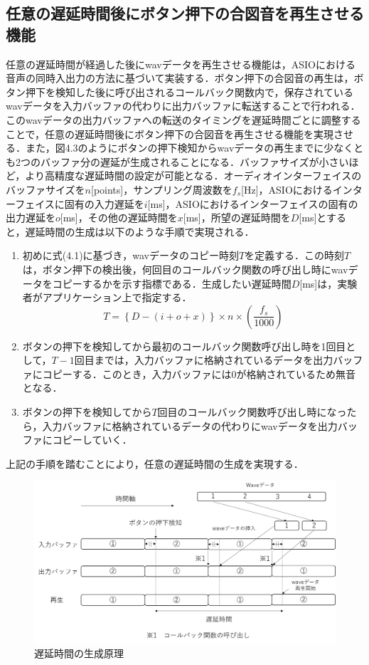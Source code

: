 \subsection{任意の遅延時間後にボタン押下の合図音を再生させる機能}
任意の遅延時間が経過した後にwavデータを再生させる機能は，ASIOにおける音声の同時入出力の方法に基づいて実装する．ボタン押下の合図音の再生は，ボタン押下を検知した後に呼び出されるコールバック関数内で，保存されているwavデータを入力バッファの代わりに出力バッファに転送することで行われる．このwavデータの出力バッファへの転送のタイミングを遅延時間ごとに調整することで，任意の遅延時間後にボタン押下の合図音を再生させる機能を実現させる．また，図4.3のようにボタンの押下検知からwavデータの再生までに少なくとも2つのバッファ分の遅延が生成されることになる．バッファサイズが小さいほど，より高精度な遅延時間の設定が可能となる．オーディオインターフェイスのバッファサイズを$n$[points]，サンプリング周波数を$f_{s}$[Hz]，ASIOにおけるインターフェイスに固有の入力遅延を$i$[ms]，ASIOにおけるインターフェイスの固有の出力遅延を$o$[ms]，その他の遅延時間を$x$[ms]，所望の遅延時間を$D$[ms]とすると，遅延時間の生成は以下のような手順で実現される．
\begin{enumerate}[leftmargin=*]
  \item 初めに式(4.1)に基づき，wavデータのコピー時刻$T$を定義する．この時刻$T$は，ボタン押下の検出後，何回目のコールバック関数の呼び出し時にwavデータをコピーするかを示す指標である．生成したい遅延時間$D$[ms]は，実験者がアプリケーション上で指定する．
\begin{equation}
T = \left\{ D - (i + o + x) \right\} \times n \times \left( \frac{f_s}{1000} \right) \label{eq:my_equation}
\end{equation}

  \item ボタンの押下を検知してから最初のコールバック関数呼び出し時を1回目として，$T-1$回目までは，入力バッファに格納されているデータを出力バッファにコピーする．このとき，入力バッファには0が格納されているため無音となる．
  \item ボタンの押下を検知してから$T$回目のコールバック関数呼び出し時になったら，入力バッファに格納されているデータの代わりにwavデータを出力バッファにコピーしていく．
\end{enumerate}
上記の手順を踏むことにより，任意の遅延時間の生成を実現する．
\begin{figure}[h]
  \centering
  \includegraphics[scale=0.45]{figures/System/Delay_theory.png}
  \caption{遅延時間の生成原理}
\end{figure}
